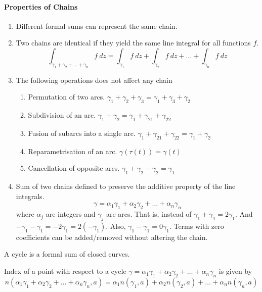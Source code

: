 \paragraph{Properties of Chains}
\begin{enumerate}
	\item Different formal sums can represent the same chain.
	\item Two chains are identical if they yield the same line integral for all functions $f$.
		\[ \int_{\gamma_1+\gamma_2+\dots+\gamma_n} f\ dz = \int_{\gamma_1} f\ dz + \int_{\gamma_2} f\ dz + \dots + \int_{\gamma_n} f\ dz \]
	\item The following operations does not affect any chain
	\begin{enumerate}
		\item Permutation of two arcs. $\gamma_1+\gamma_2+\gamma_3 = \gamma_1+\gamma_3+\gamma_2$
		\item Subdivision of an arc. $\gamma_1+\gamma_2 = \gamma_1 + \gamma_{21} + \gamma_{22}$
		\item Fusion of subarcs into a single arc. $\gamma_1 + \gamma_{21}+\gamma_{22} = \gamma_1+\gamma_2$
		\item Reparametrisation of an arc. $\gamma(\tau(t)) = \gamma(t)$
		\item Cancellation of opposite arcs. $\gamma_1 + \gamma_2 - \gamma_2 = \gamma_1$
	\end{enumerate}
	\item Sum of two chains defined to preserve the additive property of the line integrals.
		\[ \gamma = \alpha_1 \gamma_1 + \alpha_2 \gamma_2 + \dots + \alpha_n \gamma_n \]
		where $\alpha_j$ are integers and $\gamma_j$ are arcs.
		That is, instead of $\gamma_1 + \gamma_1 = 2\gamma_1$.
		And $-\gamma_1-\gamma_1 = -2\gamma_1 = 2(-\gamma_1)$.
		Also, $\gamma_1 - \gamma_1 = 0 \gamma_1$.
		Terms with zero coefficients can be added/removed without altering the chain.
\end{enumerate}
\begin{definition}[cycle]
	A cycle is a formal sum of closed curves.
\end{definition}
\begin{definition}
	Index of a point with respect to a cycle $\gamma = \alpha_1\gamma_1+\alpha_2\gamma_2+\dots+\alpha_n\gamma_n$ is given by
	\begin{equation}
		n(\alpha_1\gamma_1+\alpha_2\gamma_2+\dots+\alpha_n\gamma_n,a) = \alpha_1n(\gamma_1,a) + \alpha_2n(\gamma_2,a)+\dots + \alpha_nn(\gamma_n,a)
	\end{equation}
\end{definition}

